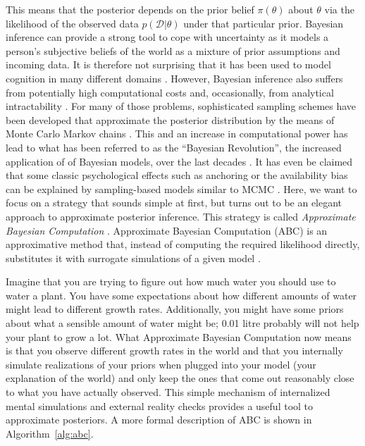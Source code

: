 \documentclass[a4paper,man, natbib]{apa6}
\begin{document}
This means that the posterior depends on the prior belief $\pi(\theta)$ about $\theta$ via the likelihood of the observed data $p(\mathcal{D}|\theta)$ under that particular prior. Bayesian inference can provide a strong tool to cope with uncertainty as it models a person's subjective beliefs of the world as a mixture of prior assumptions and incoming data. It is therefore not surprising that it has been used to model cognition in many different domains \citep{oaksford2007bayesian}. However, Bayesian inference also suffers from potentially high computational costs and, occasionally, from analytical intractability \citep{dagum1993approximating}. For many of those problems, sophisticated sampling schemes have been developed that approximate the posterior distribution by the means of Monte Carlo Markov chains \citep{gilks2005markov}. This and an increase in computational power has lead to what has been referred to as the ``Bayesian Revolution'', the increased application of of Bayesian models, over the last decades \citep{brooks2003bayesian}. It has even be claimed that some classic psychological effects such as anchoring or the availability bias can be explained by sampling-based models similar to MCMC \citep{lieder2012burn}. Here, we want to focus on a strategy that sounds simple at first, but turns out to be an elegant approach to approximate posterior inference. This strategy is called \emph{Approximate Bayesian Computation} \citep{turner2012tutorial}. Approximate Bayesian Computation (ABC) is an approximative method that, instead of computing the required likelihood directly, substitutes it with surrogate simulations of a given model \citep{csillery2010approximate}.

Imagine that you are trying to figure out how much water you should use to water a plant. You have some expectations about how different amounts of water might lead to different growth rates. Additionally, you might have some priors about what a sensible amount of water might be; 0.01 litre probably will not help your plant to grow a lot. What Approximate Bayesian Computation now means is that you observe different growth rates in the world and that you internally simulate realizations of your priors when plugged into your model (your explanation of the world) and only keep the ones that come out reasonably close to what you have actually observed. This simple mechanism of internalized mental simulations and external reality checks provides a useful tool to approximate posteriors. A more formal description of ABC is shown in Algorithm~\ref{alg:abc}.
 
\end{document}
